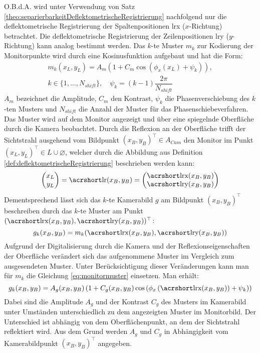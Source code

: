 \p
O.B.d.A. wird unter Verwendung von Satz \ref{theo:separierbarkeitDeflektometrischeRegistrierung} nachfolgend nur die deflektometrische Registrierung der Spaltenpositionen \acrshort{lrx} ($x$-Richtung) betrachtet.
Die deflektometrische Registrierung der Zeilenpositionen \acrshort{lry} ($y$-Richtung) kann analog bestimmt werden.
Das $k$-te Muster $m_k$ zur Kodierung der Monitorpunkte wird durch eine Kosinusfunktion aufgebaut und hat die Form:
%
\begin{equation}\label{eq:monitormuster}
	\begin{gathered}	
		m_k(x_L,y_L) = A_m \left(1 + C_m \cos \left(\phi_{x}\left(x_L\right) + \psi_k\right)\right),\\
		k \in \lbrace 1,\ldots,N_{shift}\rbrace,
		\quad
		\psi_k = (k - 1)\dfrac{2\pi}{N_{shift}}
	\end{gathered}
\end{equation}
%
$A_m$ bezeichnet die Amplitude, $C_m$ den Kontrast, $\psi_k$ die Phasenverschiebung des $k$-ten Musters und $N_{shift}$ die Anzahl der Muster für das Phasenschiebeverfahren.
Das Muster wird auf dem Monitor angezeigt und über eine spiegelnde Oberfläche durch die Kamera beobachtet.
Durch die Reflexion an der Oberfläche trifft der Sichtstrahl ausgehend vom Bildpunkt $(x_B, y_B)^\top \in A_{Cam}$ den Monitor im Punkt $(x_L, y_L)^\top \in L \cup \varnothing$, welcher durch die Abbildung aus Definition \ref{def:deflektometrischeRegistrierung} beschrieben werden kann:
%
\begin{equation}
	\begin{pmatrix}
		x_L \\ 
		y_L
	\end{pmatrix}
	= \acrshortmath{lr}(x_B, y_B) = 
	\begin{pmatrix}
		\acrshortmath{lrx}(x_B, y_B) \\ 
		\acrshortmath{lry}(x_B, y_B)
	\end{pmatrix} 
\end{equation}
%
Dementsprechend lässt sich das $k$-te Kamerabild $g$ am Bildpunkt $(x_B, y_B)^\top$ beschreiben durch das $k$-te Muster am Punkt $(\acrshortmath{lrx}(x_B, y_B), \acrshortmath{lry}(x_B, y_B))^\top$:
%
\begin{equation}
	g_k(x_B, y_B) = m_k(\acrshortmath{lrx}(x_B, y_B), \acrshortmath{lry}(x_B, y_B))
\end{equation}
%
Aufgrund der Digitalisierung durch die Kamera und der Reflexionseigenschaften der Oberfläche verändert sich das aufgenommene Muster im Vergleich zum ausgesendeten Muster.
Unter Berücksichtigung dieser Veränderungen kann man für $m_k$ die Gleichung \ref{eq:monitormuster} einsetzen.
Man erhält:
%
\begin{equation}\label{eq:kamerabild}
	g_k(x_B, y_B) = A_g(x_B, y_B) \left(1 + C_g(x_B, y_B) \cos \left(\phi_{x}\left(\acrshortmath{lrx}(x_B, y_B)\right) + \psi_k\right)\right)
\end{equation}
%
Dabei sind die Amplitude $A_g$ und der Kontrast $C_g$ des Musters im Kamerabild unter Umständen unterschiedlich zu dem angezeigten Muster im Monitorbild.
Der Unterschied ist abhängig von dem Oberflächenpunkt, an dem der Sichtstrahl reflektiert wird.
Aus dem Grund werden $A_g$ und $C_g$ in Abhängigkeit vom Kamerabildpunkt $(x_B, y_B)^\top$ angegeben.

